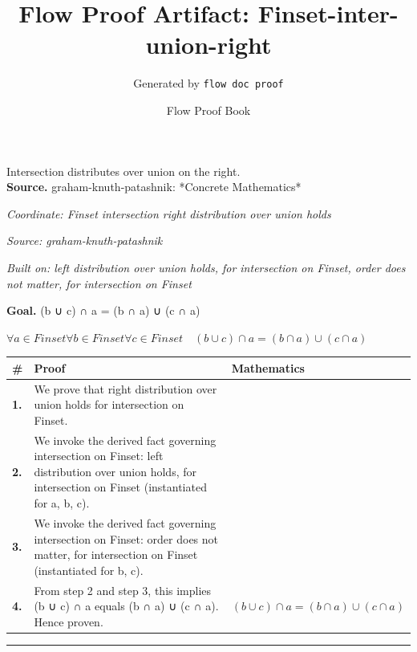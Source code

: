 \documentclass[11pt]{article}
\title{Flow Proof Artifact: Finset-inter-union-right}
\author{Generated by \texttt{flow doc proof}}
\date{Flow Proof Book}
\theoremstyle{definition}
\begin{document}
\maketitle
Intersection distributes over union on the right.\\[0.5em]
\textbf{Source.} graham-knuth-patashnik: *Concrete Mathematics*\\[0.5em]
\bigskip
{}\par
\smallskip\noindent\textit{Coordinate: Finset \cdot intersection \cdot right distribution over union holds}\par
\smallskip\noindent\textit{Source: graham-knuth-patashnik}\par
\smallskip\noindent\textit{Built on: left distribution over union holds, for intersection on Finset, order does not matter, for intersection on Finset}\par
\medskip
\noindent\textbf{Goal.} (b ∪ c) ∩ a = (b ∩ a) ∪ (c ∩ a)\par
\noindent$\displaystyle \forall a \in Finset \forall b \in Finset \forall c \in Finset\quad (b ∪ c) ∩ a = (b ∩ a) ∪ (c ∩ a)$\par
\medskip
\noindent
\begin{tabular}{@{} >{\raggedright\arraybackslash}p{} >{\raggedright\arraybackslash}p{} >{\raggedleft\arraybackslash}p{} @{}}
\textbf{\#} & \textbf{Proof} & \textbf{Mathematics} \\
\midrule
\textbf{1.} & We prove that right distribution over union holds for intersection on Finset. & \\[0.45em]
\textbf{2.} & We invoke the derived fact governing intersection on Finset: left distribution over union holds, for intersection on Finset (instantiated for a, b, c). & \\[0.45em]
\textbf{3.} & We invoke the derived fact governing intersection on Finset: order does not matter, for intersection on Finset (instantiated for b, c). & \\[0.45em]
\textbf{4.} & From step 2 and step 3, this implies (b ∪ c) ∩ a equals (b ∩ a) ∪ (c ∩ a). Hence proven. & $\displaystyle (b ∪ c) ∩ a = (b ∩ a) ∪ (c ∩ a)$ \\[0.45em]
\bottomrule
\end{tabular}
\label{thm:Finset-intersection-right_distribution_over_union_holds}
\par\medskip\hrule
\end{document}

